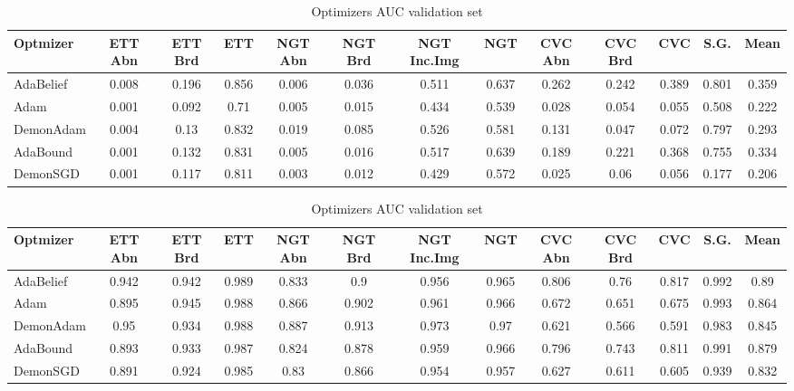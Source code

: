 \documentclass[journal, a4paper]{IEEEtran}
\begin{document}
\begin{table}[ht]
	\bigskip
	\begin{minipage}{\linewidth}
		\centering
		\begin{tabular}{||l c c c c c c c c c c c c||}
			\hline
			Optmizer  & ETT Abn & ETT Brd & ETT   & NGT Abn & NGT Brd & NGT Inc.Img & NGT   & CVC Abn & CVC Brd & CVC   & S.G.  & Mean  \\ [0.5ex] \hline\hline
			AdaBelief & 0.008   & 0.196   & 0.856 & 0.006   & 0.036   & 0.511       & 0.637 & 0.262   & 0.242   & 0.389 & 0.801 & 0.359 \\ \hline
			Adam      & 0.001   & 0.092   & 0.71  & 0.005   & 0.015   & 0.434       & 0.539 & 0.028   & 0.054   & 0.055 & 0.508 & 0.222 \\ \hline
			DemonAdam & 0.004   & 0.13    & 0.832 & 0.019   & 0.085   & 0.526       & 0.581 & 0.131   & 0.047   & 0.072 & 0.797 & 0.293 \\ \hline
			AdaBound  & 0.001   & 0.132   & 0.831 & 0.005   & 0.016   & 0.517       & 0.639 & 0.189   & 0.221   & 0.368 & 0.755 & 0.334 \\ \hline
			DemonSGD  & 0.001   & 0.117   & 0.811 & 0.003   & 0.012   & 0.429       & 0.572 & 0.025   & 0.06    & 0.056 & 0.177 & 0.206 \\ [0.5ex] \hline
		\end{tabular}
		\label{tab:optimizers_amcc}
		\caption{Optimizers Area MCC validation set}
	\end{minipage}
			  
	\bigskip
	\begin{minipage}{\linewidth}
		\centering
		\begin{tabular}{||l c c c c c c c c c c c c||}
			\hline
			Optmizer  & ETT Abn & ETT Brd & ETT   & NGT Abn & NGT Brd & NGT Inc.Img & NGT   & CVC Abn & CVC Brd & CVC   & S.G.  & Mean  \\ [0.5ex] \hline\hline
			AdaBelief & 0.942   & 0.942   & 0.989 & 0.833   & 0.9     & 0.956       & 0.965 & 0.806   & 0.76    & 0.817 & 0.992 & 0.89  \\ \hline
			Adam      & 0.895   & 0.945   & 0.988 & 0.866   & 0.902   & 0.961       & 0.966 & 0.672   & 0.651   & 0.675 & 0.993 & 0.864 \\ \hline
			DemonAdam & 0.95    & 0.934   & 0.988 & 0.887   & 0.913   & 0.973       & 0.97  & 0.621   & 0.566   & 0.591 & 0.983 & 0.845 \\ \hline
			AdaBound  & 0.893   & 0.933   & 0.987 & 0.824   & 0.878   & 0.959       & 0.966 & 0.796   & 0.743   & 0.811 & 0.991 & 0.879 \\ \hline
			DemonSGD  & 0.891   & 0.924   & 0.985 & 0.83    & 0.866   & 0.954       & 0.957 & 0.627   & 0.611   & 0.605 & 0.939 & 0.832 \\ [0.5ex] \hline
		\end{tabular}
		\label{tab:optimizers_auc}
		\caption{Optimizers AUC validation set}
	\end{minipage}
\end{table}
\end{document}
